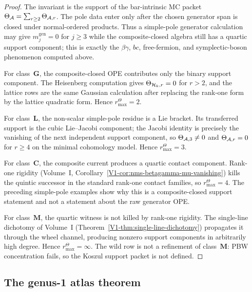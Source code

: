 \begin{proof}
The invariant is the support of the bar-intrinsic MC packet
\(\Theta_{\mathcal{A}}=\sum_{r\ge2}\Theta_{\mathcal{A},r}\).  The pole data enter only
after the chosen generator span is closed under normal-ordered
products.  Thus a simple-pole generator calculation may give
\(m^{\mathrm{gen}}_j=0\) for \(j\ge3\) while the composite-closed
algebra still has a quartic support component; this is exactly the
\(\beta\gamma\), \(bc\), free-fermion, and symplectic-boson
phenomenon computed above.

For class~\(\mathbf G\), the composite-closed OPE contributes only the
binary support component.  The Heisenberg computation gives
\(\Theta_{\mathcal{H}_k,r}=0\) for \(r>2\), and the lattice rows are the same
Gaussian calculation after replacing the rank-one form by the lattice
quadratic form.  Hence \(r^\Theta_{\max}=2\).

For class~\(\mathbf L\), the non-scalar simple-pole residue is a Lie
bracket.  Its transferred support is the cubic Lie--Jacobi component;
the Jacobi identity is precisely the vanishing of the next independent
support component, so \(\Theta_{\mathcal{A},3}\ne0\) and
\(\Theta_{\mathcal{A},r}=0\) for \(r\ge4\) on the minimal cohomology model.
Hence \(r^\Theta_{\max}=3\).

For class~\(\mathbf C\), the composite current produces a quartic
contact component.  Rank-one rigidity
(Volume~I, Corollary~\ref*{V1-cor:nms-betagamma-mu-vanishing})
kills the quintic successor in the standard rank-one contact families,
so \(r^\Theta_{\max}=4\).  The preceding simple-pole examples show why
this is a composite-closed support statement and not a statement about
the raw generator OPE.

For class~\(\mathbf M\), the quartic witness is not killed by
rank-one rigidity.  The single-line dichotomy of Volume~I
(Theorem~\ref*{V1-thm:single-line-dichotomy}) propagates it through the
wheel channel, producing nonzero support components in arbitrarily high
degree.  Hence \(r^\Theta_{\max}=\infty\).  The wild row is not a
refinement of class~\(\mathbf M\): PBW concentration fails, so the
Koszul support packet is not defined.
\end{proof}

\subsection{The genus-1 atlas theorem}%
\label{subsec:genus1-atlas-theorem}

